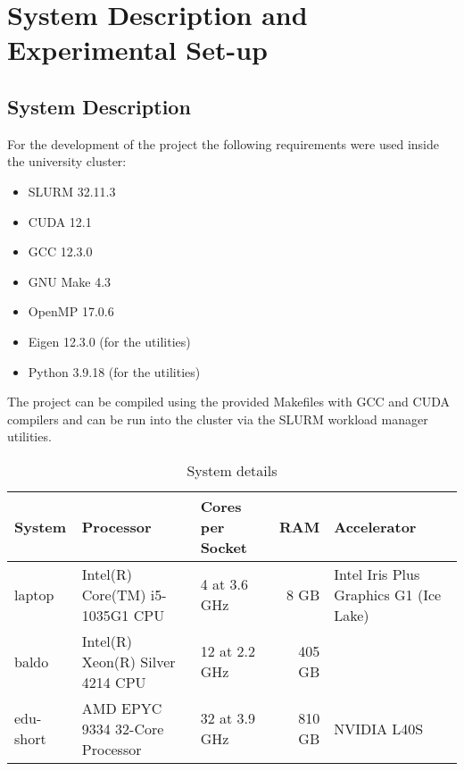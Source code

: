 \documentclass[conference]{IEEEtran}
\begin{document}
    \section{System Description and Experimental Set-up}
        \subsection{System Description}

        For the development of the project the following requirements were used
        inside the university cluster:
        \begin{itemize}
            \item SLURM 32.11.3
            \item CUDA 12.1
            \item GCC 12.3.0
            \item GNU Make 4.3
            \item OpenMP 17.0.6
            \item Eigen 12.3.0 (for the utilities)
            \item Python 3.9.18 (for the utilities) 
        \end{itemize}

        The project can be compiled using the provided Makefiles with GCC and
        CUDA compilers and can be run into the cluster via the SLURM workload
        manager utilities.

        \begin{table}[ht]
            \caption{System details}
            \label{tab:system_description}
            \centering
            \begin{adjustbox}{width=\columnwidth}
            \begin{tabular}{lllrl}
            \toprule
            \textbf{System} &  \textbf{Processor} & \textbf{Cores per Socket} & \textbf{RAM} & \textbf{Accelerator} \\
            \midrule
                laptop & Intel(R) Core(TM) i5-1035G1 CPU & 4 at 3.6 GHz & 8 GB & Intel Iris Plus Graphics G1 (Ice Lake) \\
                baldo & Intel(R) Xeon(R) Silver 4214 CPU & 12 at 2.2 GHz & 405 GB & \\
                edu-short & AMD EPYC 9334 32-Core Processor & 32 at 3.9 GHz & 810 GB & NVIDIA L40S \\
            \bottomrule
            \end{tabular}
            \end{adjustbox}
        \end{table}
\end{document}
